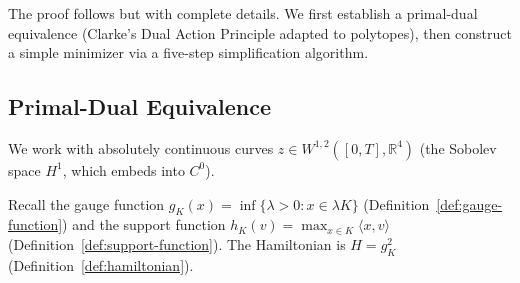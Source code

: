 %
%


The proof follows \cite{HK2017} but with complete details. We first
establish a primal-dual equivalence (Clarke's Dual Action Principle
adapted to polytopes), then construct a simple minimizer via a
five-step simplification algorithm.


\subsection{Primal-Dual Equivalence}\label{subsec:primal-dual}


We work with absolutely continuous curves
$z \in W^{1,2}([0, T], \mathbb{R}^4)$
(the Sobolev space $H^1$, which embeds into $C^0$).

Recall the gauge function $g_K(x) = \inf\{\lambda > 0 : x \in \lambda K\}$
(Definition~\ref{def:gauge-function}) and the support function
$h_K(v) = \max_{x \in K} \langle x, v \rangle$
(Definition~\ref{def:support-function}).
The Hamiltonian is $H = g_K^2$ (Definition~\ref{def:hamiltonian}).


